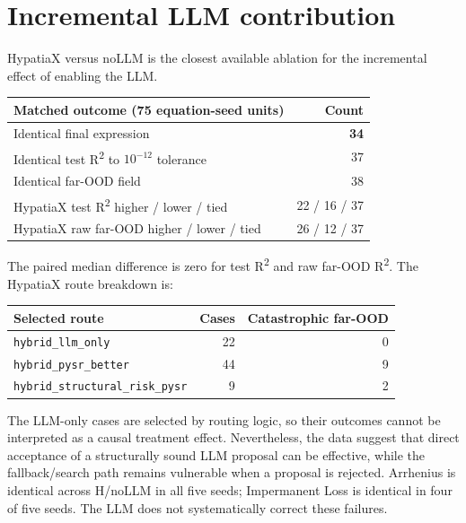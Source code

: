 \documentclass[11pt,a4paper]{article}
\begin{document}
\section{Incremental LLM contribution}
HypatiaX versus noLLM is the closest available ablation for the incremental effect of enabling the LLM.

\begin{center}
\small
\begin{tabular}{lr}
\toprule
Matched outcome (75 equation-seed units) & Count\\
\midrule
Identical final expression & \textbf{34}\\
Identical test R\textsuperscript{2} to $10^{-12}$ tolerance & 37\\
Identical far-OOD field & 38\\
HypatiaX test R\textsuperscript{2} higher / lower / tied & 22 / 16 / 37\\
HypatiaX raw far-OOD higher / lower / tied & 26 / 12 / 37\\
\bottomrule
\end{tabular}
\end{center}

The paired median difference is zero for test R\textsuperscript{2} and raw far-OOD R\textsuperscript{2}. The HypatiaX route breakdown is:
\begin{center}
\small
\begin{tabular}{lrr}
\toprule
Selected route & Cases & Catastrophic far-OOD\\
\midrule
\texttt{hybrid\_llm\_only} & 22 & 0\\
\texttt{hybrid\_pysr\_better} & 44 & 9\\
\texttt{hybrid\_structural\_risk\_pysr} & 9 & 2\\
\bottomrule
\end{tabular}
\end{center}
The LLM-only cases are selected by routing logic, so their outcomes cannot be interpreted as a causal treatment effect. Nevertheless, the data suggest that direct acceptance of a structurally sound LLM proposal can be effective, while the fallback/search path remains vulnerable when a proposal is rejected. Arrhenius is identical across H/noLLM in all five seeds; Impermanent Loss is identical in four of five seeds. The LLM does not systematically correct these failures.
\end{document}
